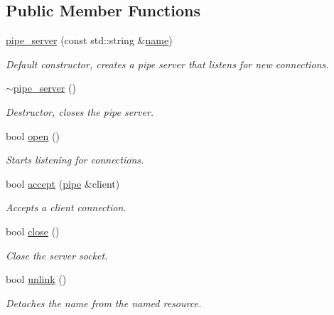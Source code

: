 \subsection*{Public Member Functions}
\begin{DoxyCompactItemize}
\item 
\mbox{\label{classcpen333_1_1process_1_1windows_1_1pipe__server_a56a0e55c0db7c3be6b6c489e761f219a}} 
\hyperlink{classcpen333_1_1process_1_1windows_1_1pipe__server_a56a0e55c0db7c3be6b6c489e761f219a}{pipe\+\_\+server} (const std\+::string \&\hyperlink{classcpen333_1_1process_1_1impl_1_1named__resource__base_a53986a0a1dd26a3602b842c45613b79d}{name})
\begin{DoxyCompactList}\small\item\em Default constructor, creates a pipe server that listens for new connections. \end{DoxyCompactList}\item 
\mbox{\label{classcpen333_1_1process_1_1windows_1_1pipe__server_acea2e918a6ba35f8eb856542ee697334}} 
\hyperlink{classcpen333_1_1process_1_1windows_1_1pipe__server_acea2e918a6ba35f8eb856542ee697334}{$\sim$pipe\+\_\+server} ()
\begin{DoxyCompactList}\small\item\em Destructor, closes the pipe server. \end{DoxyCompactList}\item 
bool \hyperlink{classcpen333_1_1process_1_1windows_1_1pipe__server_a3d44407143efc64e27b5b6455ad8ae8c}{open} ()
\begin{DoxyCompactList}\small\item\em Starts listening for connections. \end{DoxyCompactList}\item 
bool \hyperlink{classcpen333_1_1process_1_1windows_1_1pipe__server_ab46c9f9214309d9d8bd8115758863259}{accept} (\hyperlink{classcpen333_1_1process_1_1windows_1_1pipe}{pipe} \&client)
\begin{DoxyCompactList}\small\item\em Accepts a client connection. \end{DoxyCompactList}\item 
bool \hyperlink{classcpen333_1_1process_1_1windows_1_1pipe__server_a4c27e283566395d1f7236bff91413737}{close} ()
\begin{DoxyCompactList}\small\item\em Close the server socket. \end{DoxyCompactList}\item 
bool \hyperlink{classcpen333_1_1process_1_1windows_1_1pipe__server_aa3f9fb4fd88042b09e130cd616815fe1}{unlink} ()
\begin{DoxyCompactList}\small\item\em Detaches the name from the named resource. \end{DoxyCompactList}\end{DoxyCompactItemize}
